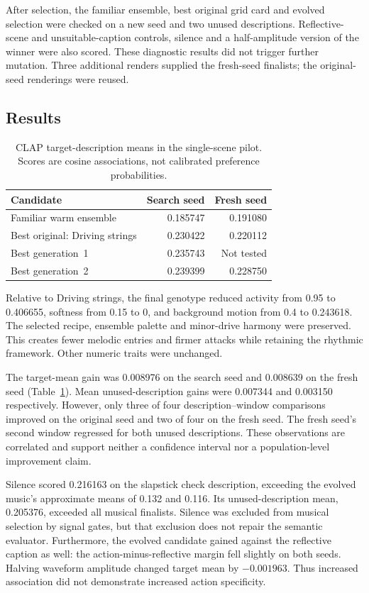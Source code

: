 \documentclass[11pt]{article}
\begin{document}
After selection, the familiar ensemble, best original grid card and evolved selection were checked on a new seed and two unused descriptions. Reflective-scene and unsuitable-caption controls, silence and a half-amplitude version of the winner were also scored. These diagnostic results did not trigger further mutation. Three additional renders supplied the fresh-seed finalists; the original-seed renderings were reused.

\subsection{Results}
\begin{table}[ht]
\centering
\caption{CLAP target-description means in the single-scene pilot. Scores are cosine associations, not calibrated preference probabilities.}
\begin{tabular}{lrr}
\toprule
Candidate & Search seed & Fresh seed\\
\midrule
Familiar warm ensemble & 0.185747 & 0.191080\\
Best original: Driving strings & 0.230422 & 0.220112\\
Best generation~1 & 0.235743 & Not tested\\
Best generation~2 & 0.239399 & 0.228750\\
\bottomrule
\end{tabular}
\label{tab:pilot}
\end{table}

Relative to Driving strings, the final genotype reduced activity from 0.95 to 0.406655, softness from 0.15 to 0, and background motion from 0.4 to 0.243618. The selected recipe, ensemble palette and minor-drive harmony were preserved. This creates fewer melodic entries and firmer attacks while retaining the rhythmic framework. Other numeric traits were unchanged.

The target-mean gain was 0.008976 on the search seed and 0.008639 on the fresh seed (Table~\ref{tab:pilot}). Mean unused-description gains were 0.007344 and 0.003150 respectively. However, only three of four description--window comparisons improved on the original seed and two of four on the fresh seed. The fresh seed's second window regressed for both unused descriptions. These observations are correlated and support neither a confidence interval nor a population-level improvement claim.

Silence scored 0.216163 on the slapstick check description, exceeding the evolved music's approximate means of 0.132 and 0.116. Its unused-description mean, 0.205376, exceeded all musical finalists. Silence was excluded from musical selection by signal gates, but that exclusion does not repair the semantic evaluator. Furthermore, the evolved candidate gained against the reflective caption as well: the action-minus-reflective margin fell slightly on both seeds. Halving waveform amplitude changed target mean by $-0.001963$. Thus increased association did not demonstrate increased action specificity.
\end{document}

